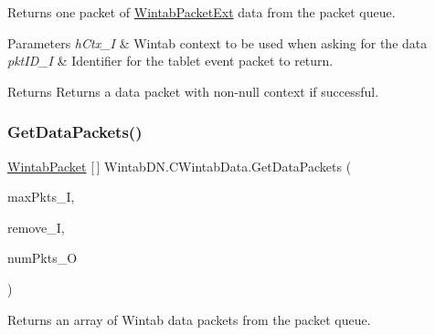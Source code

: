 Returns one packet of \mbox{\hyperlink{struct_wintab_d_n_1_1_wintab_packet_ext}{Wintab\+Packet\+Ext}} data from the packet queue. 


\begin{DoxyParams}{Parameters}
{\em h\+Ctx\+\_\+I} & Wintab context to be used when asking for the data\\
\hline
{\em pkt\+I\+D\+\_\+I} & Identifier for the tablet event packet to return.\\
\hline
\end{DoxyParams}
\begin{DoxyReturn}{Returns}
Returns a data packet with non-\/null context if successful.
\end{DoxyReturn}
\mbox{\label{class_wintab_d_n_1_1_c_wintab_data_af444201f4a176ebe322b4fa473621a19}} 
\subsubsection{\texorpdfstring{Get\+Data\+Packets()}{GetDataPackets()}}
{\footnotesize\ttfamily \mbox{\hyperlink{struct_wintab_d_n_1_1_wintab_packet}{Wintab\+Packet}} \mbox{[}$\,$\mbox{]} Wintab\+D\+N.\+C\+Wintab\+Data.\+Get\+Data\+Packets (\begin{DoxyParamCaption}\item[{U\+Int32}]{max\+Pkts\+\_\+I,  }\item[{bool}]{remove\+\_\+I,  }\item[{ref U\+Int32}]{num\+Pkts\+\_\+O }\end{DoxyParamCaption})\hspace{0.3cm}{\ttfamily [inline]}}



Returns an array of Wintab data packets from the packet queue. 



